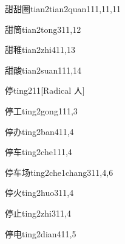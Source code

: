 \begin{verbete}{甜甜圈}{tian2tian2quan1}{11,11,11}
\end{verbete}

\begin{verbete}{甜筒}{tian2tong3}{11,12}
\end{verbete}

\begin{verbete}{甜稚}{tian2zhi4}{11,13}
\end{verbete}

\begin{verbete}{甜酸}{tian2suan1}{11,14}
\end{verbete}

\begin{verbete}{停}{ting2}{11}[Radical 人]
\end{verbete}

\begin{verbete}{停工}{ting2gong1}{11,3}
\end{verbete}

\begin{verbete}{停办}{ting2ban4}{11,4}
\end{verbete}

\begin{verbete}{停车}{ting2che1}{11,4}
\end{verbete}

\begin{verbete}{停车场}{ting2che1chang3}{11,4,6}
\end{verbete}

\begin{verbete}{停火}{ting2huo3}{11,4}
\end{verbete}

\begin{verbete}{停止}{ting2zhi3}{11,4}
\end{verbete}

\begin{verbete}{停电}{ting2dian4}{11,5}
\end{verbete}

